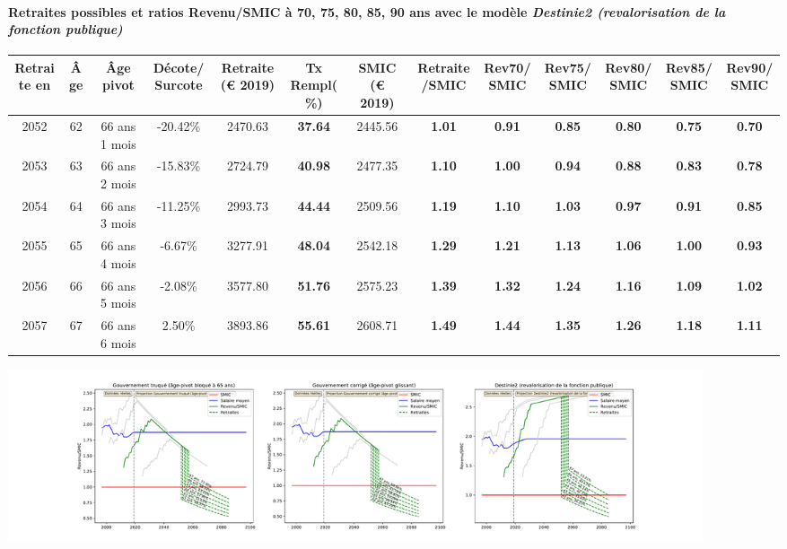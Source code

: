 \paragraph{Retraites possibles et ratios Revenu/SMIC à 70, 75, 80, 85, 90 ans avec le modèle \emph{Destinie2 (revalorisation de la fonction publique)}}  
 
{ \scriptsize \begin{center} 
\begin{tabular}[htb]{|c|c||c|c||c|c||c||c|c|c|c|c|c|} 
\hline 
 Retraite en &  Âge &  Âge pivot &  Décote/Surcote &  Retraite (\euro{} 2019) &  Tx Rempl(\%) &  SMIC (\euro{} 2019) &  Retraite/SMIC &  Rev70/SMIC &  Rev75/SMIC &  Rev80/SMIC &  Rev85/SMIC &  Rev90/SMIC \\ 
\hline \hline 
 2052 &  62 &  66 ans 1 mois &  -20.42\% &  2470.63 &  {\bf 37.64} &  2445.56 &  {\bf 1.01} &  {\bf {\color{red} 0.91}} &  {\bf {\color{red} 0.85}} &  {\bf {\color{red} 0.80}} &  {\bf {\color{red} 0.75}} &  {\bf {\color{red} 0.70}} \\ 
\hline 
 2053 &  63 &  66 ans 2 mois &  -15.83\% &  2724.79 &  {\bf 40.98} &  2477.35 &  {\bf 1.10} &  {\bf 1.00} &  {\bf {\color{red} 0.94}} &  {\bf {\color{red} 0.88}} &  {\bf {\color{red} 0.83}} &  {\bf {\color{red} 0.78}} \\ 
\hline 
 2054 &  64 &  66 ans 3 mois &  -11.25\% &  2993.73 &  {\bf 44.44} &  2509.56 &  {\bf 1.19} &  {\bf 1.10} &  {\bf 1.03} &  {\bf {\color{red} 0.97}} &  {\bf {\color{red} 0.91}} &  {\bf {\color{red} 0.85}} \\ 
\hline 
 2055 &  65 &  66 ans 4 mois &  -6.67\% &  3277.91 &  {\bf 48.04} &  2542.18 &  {\bf 1.29} &  {\bf 1.21} &  {\bf 1.13} &  {\bf 1.06} &  {\bf {\color{red} 1.00}} &  {\bf {\color{red} 0.93}} \\ 
\hline 
 2056 &  66 &  66 ans 5 mois &  -2.08\% &  3577.80 &  {\bf 51.76} &  2575.23 &  {\bf 1.39} &  {\bf 1.32} &  {\bf 1.24} &  {\bf 1.16} &  {\bf 1.09} &  {\bf 1.02} \\ 
\hline 
 2057 &  67 &  66 ans 6 mois &  2.50\% &  3893.86 &  {\bf 55.61} &  2608.71 &  {\bf 1.49} &  {\bf 1.44} &  {\bf 1.35} &  {\bf 1.26} &  {\bf 1.18} &  {\bf 1.11} \\ 
\hline 
\hline 
\end{tabular} 
\end{center} } 

 \begin{center}\includegraphics[width=0.9\textwidth]{fig/ProfCertifie_1990_22_dest_retraite.pdf}\end{center} \label{fig/ProfCertifie_1990_22_dest_retraite.pdf} 

